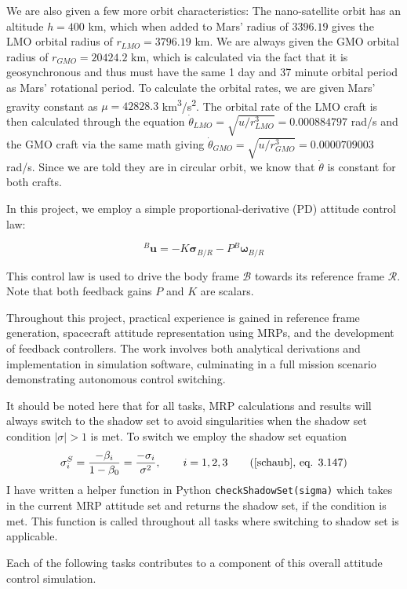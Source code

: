\documentclass[conf]{new-aiaa}
\begin{document}
We are also given a few more orbit characteristics:
The nano-satellite orbit has an altitude $h=400$ km, which when added to Mars' radius of $3396.19$ gives the LMO orbital radius of $r_{LMO} = 3796.19$ km. We are always given the GMO orbital radius of $r_{GMO} = 20424.2$ km, which is calculated via the fact that it is geosynchronous and thus must have the same 1 day and 37 minute orbital period as Mars' rotational period. 
To calculate the orbital rates, we are given Mars' gravity constant as $\mu = 42828.3$ km\textsuperscript{3}/s\textsuperscript{2}. 
The orbital rate of the LMO craft is then calculated through the equation $\dot{\theta}_{LMO} = \sqrt{u/r_{LMO}^3} = 0.000884797$ rad/s and the GMO craft via the same math giving $\dot{\theta}_{GMO} = \sqrt{u/r_{GMO}^3} = 0.0000709003$ rad/s. Since we are told they are in circular orbit, we know that $\dot{\theta}$ is constant for both crafts.

In this project, we employ a simple proportional-derivative (PD) attitude control law:

\[
{}^B\bm{u} = -K\bm{\sigma}_{B/R} - P{}^B\bm{\omega}_{B/R}
\]

This control law is used to drive the body frame \(\mathcal{B}\) towards its reference frame \(\mathcal{R}\). Note that both feedback gains \( P \) and \( K \) are scalars.

Throughout this project, practical experience is gained in reference frame generation, spacecraft attitude representation using MRPs, and the development of feedback controllers. The work involves both analytical derivations and implementation in simulation software, culminating in a full mission scenario demonstrating autonomous control switching.

It should be noted here that for all tasks, MRP calculations and results will always switch to the shadow set to avoid singularities when the shadow set condition $|\sigma| > 1$ is met. To switch we employ the shadow set equation
\[
\sigma^S_i = \frac{-\beta_i}{1-\beta_0} = \frac{-\sigma_i}{\sigma^2}, \qquad i=1,2,3 \tag{\cite{schaub},~eq. 3.147}
\]
I have written a helper function in Python \texttt{checkShadowSet(sigma)} which takes in the current MRP attitude set and returns the shadow set, if the condition is met. This function is called throughout all tasks where switching to shadow set is applicable. 

Each of the following tasks contributes to a component of this overall attitude control simulation.
\end{document}
